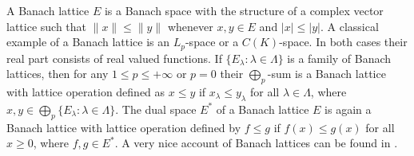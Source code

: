 A Banach lattice $E$ is a Banach space with the structure of a complex vector
lattice such that $\lVert x\rVert\leq \lVert y\rVert$ whenever $x, y\in E$ 
and $|x|\leq |y|$. A classical example of a Banach lattice is an $L_p$-space 
or a $C(K)$-space. In both cases their real part consists of real 
valued functions. If $ \{E_\lambda:\lambda\in\Lambda \}$ is a family 
of Banach lattices, then for any $1\leq p\leq +\infty$ or $p=0$ 
their $\bigoplus_p$-sum is a Banach lattice with lattice operation defined 
as $x\leq y$ if $x_\lambda\leq y_\lambda$ for all $\lambda\in\Lambda$, where 
$x,y\in\bigoplus_p \{ E_\lambda:\lambda\in\Lambda \}$. 
The dual space $E^*$ of a Banach lattice $E$ is again a Banach lattice with
lattice operation defined by $f\leq g$ if $f(x)\leq g(x)$ for all $x\geq 0$,
where $f,g\in  E^*$. A very nice account of Banach lattices can be found in
\cite[section 1]{LaceyIsomThOfClassicBanSp}.

